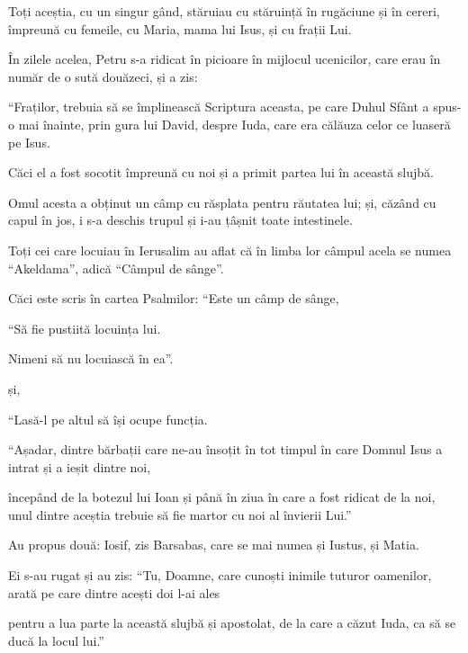 {Toți aceștia, cu un singur gând, stăruiau cu stăruință în rugăciune și în cereri, împreună cu femeile, cu Maria, mama lui Isus, și cu frații Lui.


\par }{\PP {}În zilele acelea, Petru s-a ridicat în picioare în mijlocul ucenicilor, care erau în număr de o sută douăzeci, și a zis:

“Fraților, trebuia să se împlinească Scriptura aceasta, pe care Duhul Sfânt a spus-o mai înainte, prin gura lui David, despre Iuda, care era călăuza celor ce luaseră pe Isus.

Căci el a fost socotit împreună cu noi și a primit partea lui în această slujbă.

Omul acesta a obținut un câmp cu răsplata pentru răutatea lui; și, căzând cu capul în jos, i s-a deschis trupul și i-au țâșnit toate intestinele.

Toți cei care locuiau în Ierusalim au aflat că în limba lor câmpul acela se numea “Akeldama”, adică “Câmpul de sânge”.

Căci este scris în cartea Psalmilor: “Este un câmp de sânge,

\par }{\Q “Să fie pustiită locuința lui.

\par }{\QB Nimeni să nu locuiască în ea”.

\par }{\PP și,

\par }{\Q “Lasă-l pe altul să își ocupe funcția.


\par }{\PP {}“Așadar, dintre bărbații care ne-au însoțit în tot timpul în care Domnul Isus a intrat și a ieșit dintre noi,

începând de la botezul lui Ioan și până în ziua în care a fost ridicat de la noi, unul dintre aceștia trebuie să fie martor cu noi al învierii Lui.”


\par }{\PP {}Au propus două: Iosif, zis Barsabas, care se mai numea și Iustus, și Matia.

Ei s-au rugat și au zis: “Tu, Doamne, care cunoști inimile tuturor oamenilor, arată pe care dintre acești doi l-ai ales

pentru a lua parte la această slujbă și apostolat, de la care a căzut Iuda, ca să se ducă la locul lui.”

}
